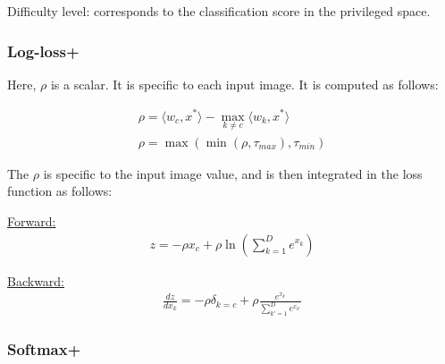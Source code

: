 Difficulty level: corresponds to the classification score in the privileged space. 



\subsubsection{Log-loss+}

Here, $\rho$ is a scalar. It is specific to each input image. It is computed as follows:

\begin{align}
 \rho = \langle w_c, x^* \rangle - \max_{k \neq c} \langle w_k, x^* \rangle \nonumber \\
 \rho = \max(\min(\rho, \tau_{max}), \tau_{min}) \nonumber
\end{align}

The $\rho$ is specific to the input image value, and is then integrated in the loss function as follows: 


  \begin{center}
  \end{center}

\noindent
\underline{Forward:} 
\begin{align}
 z = -\rho x_c + \rho \ln( \sum_{k=1}^D e^{x_k} ) \nonumber
\end{align}

\noindent
\underline{Backward:}
\begin{align}
 \frac{dz}{dx_k} = -\rho \delta_{k=c} + \rho \frac{e^{x_k}}{\sum_{k'=1}^D e^{x_{k'}}} \nonumber
\end{align}





\subsubsection{Softmax+}

